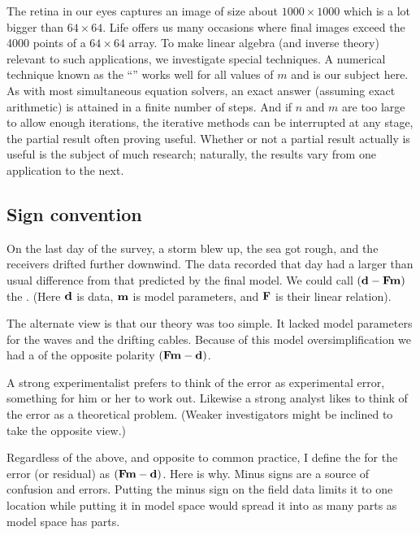 \par
The retina in our eyes captures an image of size about $1000\times 1000$
which is a lot bigger than $64\times 64$.
Life offers us many occasions where final images exceed the 4000
points of a $64\times 64$ array.
To make linear algebra (and inverse theory) relevant to such applications,
we investigate special techniques.
A numerical technique known as the
``''
works well for all values of $m$ and is our subject here.
As with most simultaneous equation solvers,
an exact answer (assuming exact arithmetic)
is attained in a finite number of steps.
And if $n$ and $m$ are too large to allow enough iterations,
the iterative methods can be interrupted at any stage,
the partial result often proving useful.
Whether or not a partial result actually is useful
is the subject of much research;
naturally, the results vary from one application to the next.

\subsection{Sign convention}
On the last day of the survey, a storm blew up,
the sea got rough, and the receivers drifted further downwind.
The data recorded that day
had a larger than usual difference
from that predicted by the final model.
We could call
$(\bold d-\bold F\bold m)$
the {\it {}}.
(Here
$\bold d$ is data,
$\bold m$ is model parameters, and
$\bold F$ is their linear relation).

\par
The alternate view is that our theory was too simple.
It lacked model parameters for the waves and the drifting cables.
Because of this model oversimplification
we had a {\it {}} of the opposite polarity
$(\bold F\bold m-\bold d)$.
\par
A strong experimentalist prefers to think of the error
as experimental error, something for him or her to work out.
Likewise a strong analyst likes to think
of the error as a theoretical problem.
(Weaker investigators might be inclined to take the opposite view.)

\par
Regardless of the above, and opposite to common practice,
I define the  for the error (or residual) as
$(\bold F\bold m-\bold d)$.
Here is why.
Minus signs are a source of confusion and errors.
Putting the minus sign on the field data limits it to one location
while putting it in model space would spread it into as many parts
as model space has parts.

